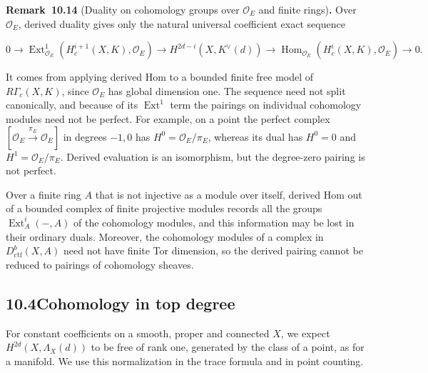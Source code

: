 \documentclass[11pt]{article}
\newenvironment{bpstatement}[2]{\par\addvspace{0.6\baselineskip}\noindent\textbf{#1}#2\textbf{.}\enspace\ignorespaces}
  {\par\addvspace{0.4\baselineskip}}
\providecommand{\Ext}{}\renewcommand{\Ext}{\operatorname{Ext}}
\providecommand{\Hom}{}\renewcommand{\Hom}{\operatorname{Hom}}
\begin{document}
\label{bp43}%
\begin{bpstatement}{Remark~10.14}{ (Duality on cohomology groups over $\mathcal O_E$ and finite rings)}
Over \(\mathcal O_E\), derived duality gives only the natural universal coefficient exact sequence

\[
0\longrightarrow
\Ext^1_{\mathcal O_E}(H_c^{i+1}(X,K),\mathcal O_E)
\longrightarrow H^{2d-i}(X,K^\vee(d))
\longrightarrow
\Hom_{\mathcal O_E}(H_c^i(X,K),\mathcal O_E)
\longrightarrow0.
\]

It comes from applying derived Hom to a bounded finite free model of \(R\Gamma_c(X,K)\), since \(\mathcal O_E\) has global dimension one. The sequence need not split canonically, and because of its \(\Ext^1\) term the pairings on individual cohomology modules need not be perfect. For example, on a point the perfect complex \([\mathcal O_E\xrightarrow{\pi_E}\mathcal O_E]\) in degrees \(-1,0\) has \(H^0=\mathcal O_E/\pi_E\), whereas its dual has \(H^0=0\) and \(H^1=\mathcal O_E/\pi_E\). Derived evaluation is an isomorphism, but the degree-zero pairing is not perfect.

Over a finite ring \(A\) that is not injective as a module over itself, derived Hom out of a bounded complex of finite projective modules records all the groups \(\Ext^i_A(-,A)\) of the cohomology modules, and this information may be lost in their ordinary duals. Moreover, the cohomology modules of a complex in \(D^b_{\mathrm{ctf}}(X,A)\) need not have finite Tor dimension, so the derived pairing cannot be reduced to pairings of cohomology sheaves.
\end{bpstatement}


\subsection*{\texorpdfstring{10.4\quad Cohomology in top degree}{10.4 Cohomology in top degree}}
\label{bp44}%
\label{bp45}%
For constant coefficients on a smooth, proper and connected \(X\), we expect \(H^{2d}(X,\Lambda_X(d))\) to be free of rank one, generated by the class of a point, as for a manifold. We use this normalization in the trace formula and in point counting.
\end{document}
